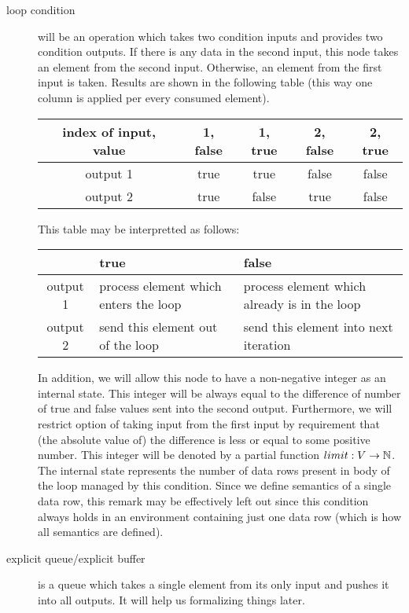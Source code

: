 \begin{define}
\begin{description}
  \item [loop condition] will be an operation which takes two condition inputs and provides two condition outputs. If there is any data in the second input, this node takes an element from the second input. Otherwise, an element from the first input is taken. Results are shown in the following table (this way one column is applied per every consumed element).
    \begin{center}
      \begin{tabular}{c|c|c|c|c}
        index of input, value & 1, false & 1, true & 2, false & 2, true \\ \hline
        output 1  & true            & true           & false           & false          \\ \hline
        output 2  & true            & false          & true            & false          \\ 
      \end{tabular}
    \end{center}
    This table may be interpretted as follows:
    \begin{center}
      \begin{tabular}{c|p{4cm}|p{4cm}}
        & true            & false \\ \hline
        output 1  & process element which enters the loop & process element which already is in the loop \\ \hline
        output 2  & send this element out of the loop & send this element into next iteration \\ 
      \end{tabular}
    \end{center}
      In addition, we will allow this node to have a non-negative integer as an internal state. This integer will be always equal to the difference of number of true and false values sent into the second output. Furthermore, we will restrict option of taking input from the first input by requirement that (the absolute value of) the difference is less or equal to some positive number. This integer will be denoted by a partial function $limit: V \rightarrow \mathbb{N}$. The internal state represents the number of data rows present in body of the loop managed by this condition. Since we define semantics of a single data row, this remark may be effectively left out since this condition always holds in an environment containing just one data row (which is how all semantics are defined). 

  \item [explicit queue/explicit buffer] is a queue which takes a single element from its only input and pushes it into all outputs. It will help us formalizing things later. 
\end{description}
\end{define}

